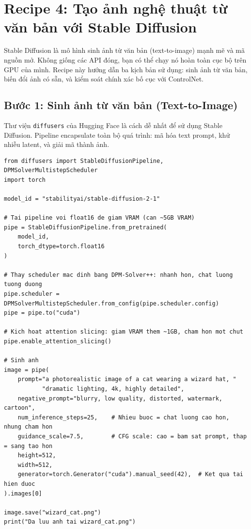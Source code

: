 \section{Recipe 4: Tạo ảnh nghệ thuật từ văn bản với Stable Diffusion}
\label{sec:recipe_stable_diffusion}

Stable Diffusion là mô hình sinh ảnh từ văn bản (text-to-image) mạnh mẽ và mã nguồn mở. Không giống các API đóng, bạn có thể chạy nó hoàn toàn cục bộ trên GPU của mình. Recipe này hướng dẫn ba kịch bản sử dụng: sinh ảnh từ văn bản, biến đổi ảnh có sẵn, và kiểm soát chính xác bố cục với ControlNet.

\subsection{Bước 1: Sinh ảnh từ văn bản (Text-to-Image)}
\label{subsec:sd_text2img}

Thư viện \texttt{diffusers} của Hugging Face là cách dễ nhất để sử dụng Stable Diffusion. Pipeline encapsulate toàn bộ quá trình: mã hóa text prompt, khử nhiễu latent, và giải mã thành ảnh.

\begin{verbatim}
from diffusers import StableDiffusionPipeline, DPMSolverMultistepScheduler
import torch

model_id = "stabilityai/stable-diffusion-2-1"

# Tai pipeline voi float16 de giam VRAM (can ~5GB VRAM)
pipe = StableDiffusionPipeline.from_pretrained(
    model_id,
    torch_dtype=torch.float16
)

# Thay scheduler mac dinh bang DPM-Solver++: nhanh hon, chat luong tuong duong
pipe.scheduler = DPMSolverMultistepScheduler.from_config(pipe.scheduler.config)
pipe = pipe.to("cuda")

# Kich hoat attention slicing: giam VRAM them ~1GB, cham hon mot chut
pipe.enable_attention_slicing()

# Sinh anh
image = pipe(
    prompt="a photorealistic image of a cat wearing a wizard hat, "
           "dramatic lighting, 4k, highly detailed",
    negative_prompt="blurry, low quality, distorted, watermark, cartoon",
    num_inference_steps=25,    # Nhieu buoc = chat luong cao hon, nhung cham hon
    guidance_scale=7.5,        # CFG scale: cao = bam sat prompt, thap = sang tao hon
    height=512,
    width=512,
    generator=torch.Generator("cuda").manual_seed(42),  # Ket qua tai hien duoc
).images[0]

image.save("wizard_cat.png")
print("Da luu anh tai wizard_cat.png")
\end{verbatim}

